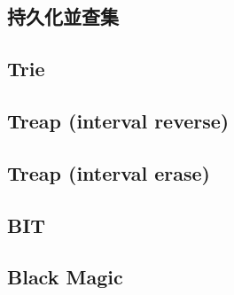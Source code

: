 \documentclass[a4paper,10pt,twocolumn,oneside]{article}
\begin{document}
\subsection{持久化並查集}


\subsection{Trie}


\subsection{Treap  (interval reverse)}


\subsection{Treap  (interval erase)}


%

\subsection{BIT}


% 

%

%

\subsection{Black Magic}

\end{document}
